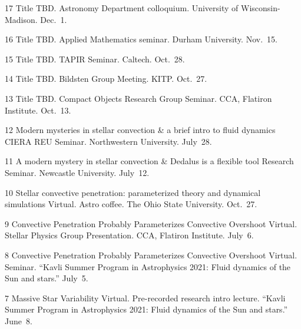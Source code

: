
      {17}
      { 
        Title TBD.
      }
      {
        Astronomy Department colloquium. University of Wisconsin-Madison. Dec.~1.
      }

\cvpub{}
      {16}
      {
        Title TBD.  
      }
      {
        Applied Mathematics seminar. Durham University. Nov.~15.
      }



\cvpub{}
      {15}
      {
        Title TBD.  
      }
      {
        TAPIR Seminar. Caltech. Oct.~28.
      }

\cvpub{}
      {14}
      {
        Title TBD.  
      }
      {
        Bildsten Group Meeting. KITP. Oct.~27.
      }




\cvpub{}
      {13}
      {
        Title TBD.  
      }
      {
        Compact Objects Research Group Seminar. CCA, Flatiron Institute. Oct.~13.
      }

\cvpub{}
      {12}
      {  
        Modern mysteries in stellar convection \& a brief intro to fluid dynamics
      }
      {
        CIERA REU Seminar. Northwestern University. July~28.
      }



\cvpub{}
      {11}
      { A modern mystery in stellar convection \& Dedalus is a flexible tool }
      {
        Research Seminar. Newcastle University. July~12.
      }

	  {10}
	  {Stellar convective penetration: parameterized theory and dynamical simulations}
	  {
	  	Virtual. Astro coffee. The Ohio State University. Oct.~27.
	  }

\cvpub{}
	  {9}
	  {Convective Penetration Probably Parameterizes Convective Overshoot}
	  {
	  	Virtual. Stellar Physics Group Presentation. CCA, Flatiron Institute. July~6.
	  }

\cvpub{}
	  {8}
	  {Convective Penetration Probably Parameterizes Convective Overshoot}
	  {
	  	Virtual. Seminar. ``Kavli Summer Program in Astrophysics 2021: Fluid dynamics of the Sun and stars.'' July~5.
	  }


\cvpub{}
	  {7}
	  {Massive Star Variability}
	  {
	  	Virtual. Pre-recorded research intro lecture. ``Kavli Summer Program in Astrophysics 2021: Fluid dynamics of the Sun and stars.'' June~8.
	  }


